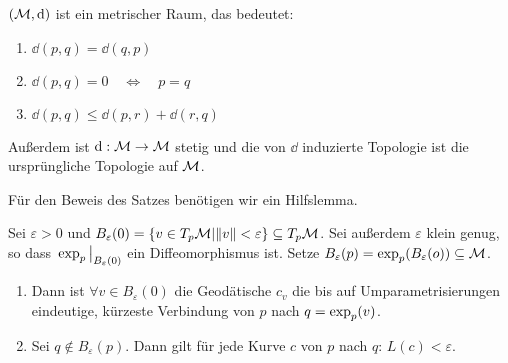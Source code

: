 \begin{satz}
\label{satz:metrischer_raum}
$(\mathcal{M}, \dd)$ ist ein metrischer Raum, das bedeutet:
\begin{enumerate}
\item  $\dd(p, q) = \dd(q, p)$
\item  $\dd(p, q) = 0  \quad \Leftrightarrow \quad p=q$
\item  $\dd(p, q) \leq \dd(p, r) + \dd(r, q)$
\end{enumerate}
Außerdem ist $\dd: \mathcal{M} \rightarrow \mathcal{M}$ stetig und die von $\dd$ induzierte Topologie ist die ursprüngliche Topologie auf $\mathcal{M}$.
\end{satz}
Für den Beweis des Satzes benötigen wir ein Hilfslemma.
\begin{lem}
Sei $\varepsilon>0$ und $B_{\varepsilon}(0) = \{ v \in T_p\mathcal{M} | \norm{v} < \varepsilon\} \subseteq T_p\mathcal{M}$. Sei außerdem $\varepsilon$ klein genug, so dass $\eval{\expp_p}_{B_{\varepsilon}(0)}$ ein Diffeomorphismus ist. Setze $B_{\varepsilon}(p) = \operatorname{exp}_p(B_{\varepsilon}(o)) \subseteq \mathcal{M}$.
\begin{enumerate}
\item Dann ist $\forall v \in B_{\varepsilon}(0)$ die Geodätische $c_v$ die bis auf Umparametrisierungen eindeutige, kürzeste Verbindung von $p$ nach $q=\operatorname{exp}_p(v)$.
\item Sei $q \notin B_{\varepsilon}(p)$. Dann gilt für jede Kurve $c$ von $p$ nach $q$: $L(c) < \varepsilon$.
\end{enumerate}
\end{lem}
